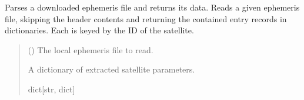\documentclass[letterpaper,10pt,english]{sphinxmanual}
\begin{document}

\begin{fulllineitems}
\label{\detokenize{modules/gps/ephemeris:qnav.gps.ephemeris.read_rinex_file}}
\pysigstartsignatures
{}
\pysigstopsignatures
\sphinxAtStartPar
Parses a downloaded ephemeris file and returns its data.
Reads a given ephemeris file, skipping the header contents and returning
the contained entry records in dictionaries. Each is keyed by the ID of
the satellite.
\begin{quote}\begin{description}
\sphinxAtStartPar
{} () \textendash{} The local ephemeris file to read.

\sphinxAtStartPar
A dictionary of extracted satellite parameters.

\sphinxAtStartPar
dict{[}str, dict{]}

\end{description}\end{quote}

\end{fulllineitems}

\end{document}

